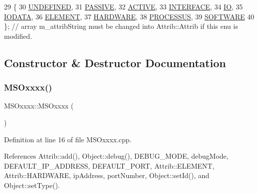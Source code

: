 \begin{DoxyCode}
29                 \{
30     \hyperlink{classAttrib_a69e171d7cc6417835a5a306d3c764235a3a8da2ab97dda18aebab196fe4100531}{UNDEFINED},
31     \hyperlink{classAttrib_a69e171d7cc6417835a5a306d3c764235a2bfb2af57b87031d190a05fe25dd92ed}{PASSIVE},
32     \hyperlink{classAttrib_a69e171d7cc6417835a5a306d3c764235a3b1fec929c0370d1436f2f06e298fb0d}{ACTIVE},
33     \hyperlink{classAttrib_a69e171d7cc6417835a5a306d3c764235aa27c16b480a369ea4d18b07b2516bbc7}{INTERFACE},
34     \hyperlink{classAttrib_a69e171d7cc6417835a5a306d3c764235a1420a5b8c0540b2af210b6975eded7f9}{IO},
35     \hyperlink{classAttrib_a69e171d7cc6417835a5a306d3c764235a0af3b0d0ac323c1704e6c69cf90add28}{IODATA},
36     \hyperlink{classAttrib_a69e171d7cc6417835a5a306d3c764235a7788bc5dd333fd8ce18562b269c9dab1}{ELEMENT},
37     \hyperlink{classAttrib_a69e171d7cc6417835a5a306d3c764235a61ceb22149f365f1780d18f9d1459423}{HARDWARE},
38     \hyperlink{classAttrib_a69e171d7cc6417835a5a306d3c764235a75250e29692496e73effca2c0330977f}{PROCESSUS},
39     \hyperlink{classAttrib_a69e171d7cc6417835a5a306d3c764235a103a67cd0b8f07ef478fa45d4356e27b}{SOFTWARE} 
40   \}; \textcolor{comment}{// array m\_attribString must be changed into Attrib::Attrib if this enu is modified. }
\end{DoxyCode}


\subsection{Constructor \& Destructor Documentation}
\mbox{\label{classMSOxxxx_afa2d5e8dcabe88d8c4ef54238a4e7bc7}} 
\subsubsection{\texorpdfstring{M\+S\+Oxxxx()}{MSOxxxx()}}
{\footnotesize\ttfamily M\+S\+Oxxxx\+::\+M\+S\+Oxxxx (\begin{DoxyParamCaption}{ }\end{DoxyParamCaption})}



Definition at line 16 of file M\+S\+Oxxxx.\+cpp.



References Attrib\+::add(), Object\+::debug(), D\+E\+B\+U\+G\+\_\+\+M\+O\+DE, debug\+Mode, D\+E\+F\+A\+U\+L\+T\+\_\+\+I\+P\+\_\+\+A\+D\+D\+R\+E\+SS, D\+E\+F\+A\+U\+L\+T\+\_\+\+P\+O\+RT, Attrib\+::\+E\+L\+E\+M\+E\+NT, Attrib\+::\+H\+A\+R\+D\+W\+A\+RE, ip\+Address, port\+Number, Object\+::set\+Id(), and Object\+::set\+Type().


